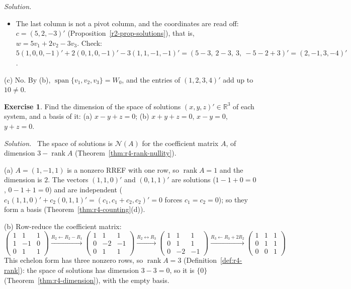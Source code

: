 \documentclass[12pt]{article}
\newcommand{\R}{\mathbb R}
\DeclareMathOperator{\rank}{rank}
\DeclareMathOperator{\Span}{span}
\theoremstyle{definition}
\newtheorem{exercise}{Exercise}
\newenvironment{solution}{\par\noindent\textit{Solution.}\ }{\par\smallskip}
\begin{document}
\begin{solution}
\begin{itemize}
the left part shows the RREF of \([v_1\ v_2\ v_3]\): every column is a pivot column, and \(v_1,v_2,v_3\) are
independent (Theorem~\ref{thm:r4-pivot-test}). Three independent vectors of the \(3\)-dimensional space \(W_0\) form a
basis of it (Theorem~\ref{thm:r4-counting}(d)).
\item The last column is not a pivot column, and the coordinates are read off: \(c=(5,2,-3)'\)
(Proposition~\ref{r2-prop-solutions}), that is, \(w=5v_1+2v_2-3v_3\). Check:
\(5(1,0,0,-1)'+2(0,1,0,-1)'-3(1,1,-1,-1)'=(5-3,\ 2-3,\ 3,\ -5-2+3)'=(2,-1,3,-4)'\).
\end{itemize}
(c) No. By (b), \(\Span\{v_1,v_2,v_3\}=W_0\), and the entries of \((1,2,3,4)'\) add up to \(10\ne0\).
\end{solution}

\begin{exercise}\label{ex:r4-solution-spaces}
Find the dimension of the space of solutions \((x,y,z)'\in\R^3\) of each system, and a basis of
it: (a) \(x-y+z=0\); (b) \(x+y+z=0\), \(x-y=0\), \(y+z=0\).
\end{exercise}
\begin{solution}
The space of solutions is \(\mathcal N(A)\) for the coefficient matrix \(A\), of dimension
\(3-\rank A\) (Theorem~\ref{thm:r4-rank-nullity}).

(a) \(A=(1,-1,1)\) is a nonzero RREF with one row, so \(\rank A=1\) and the dimension is \(2\). The
vectors \((1,1,0)'\) and \((0,1,1)'\) are solutions (\(1-1+0=0\), \(0-1+1=0\)) and are
independent (\(c_1(1,1,0)'+c_2(0,1,1)'=(c_1,c_1+c_2,c_2)'=0\) forces \(c_1=c_2=0\)); so
they form a basis (Theorem~\ref{thm:r4-counting}(d)).

(b) Row-reduce the coefficient matrix:
\[
\begin{pmatrix}1&1&1\\1&-1&0\\0&1&1\end{pmatrix}
\xrightarrow{R_2\leftarrow R_2-R_1}
\begin{pmatrix}1&1&1\\0&-2&-1\\0&1&1\end{pmatrix}
\xrightarrow{R_2\leftrightarrow R_3}
\begin{pmatrix}1&1&1\\0&1&1\\0&-2&-1\end{pmatrix}
\xrightarrow{R_3\leftarrow R_3+2R_2}
\begin{pmatrix}1&1&1\\0&1&1\\0&0&1\end{pmatrix}
\]
This echelon form has three nonzero rows, so \(\rank A=3\) (Definition~\ref{def:r4-rank}): the
space of solutions has dimension \(3-3=0\), so it is \(\{0\}\) (Theorem~\ref{thm:r4-dimension}), with the empty basis.
\end{solution}
\end{document}
